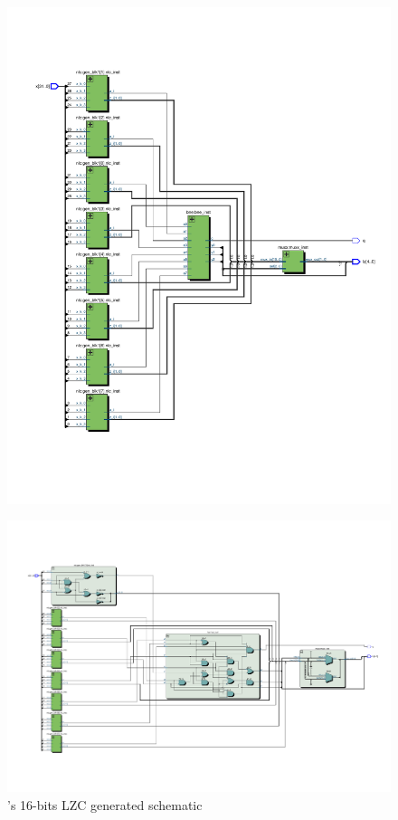 \begin{figure}
        \centering
        \includegraphics[width=\textwidth]{figures/milenkovic_quartus1.pdf}
\end{figure}

\begin{figure}
    \centering
    \includegraphics[width=\textwidth]{figures/milenkovic_quartus2.pdf}
    \caption{\cite{milenkovic_modular_2015}'s 16-bits LZC generated schematic}
    \label{fig:milenkovic_lzc_quartus}
\end{figure}


